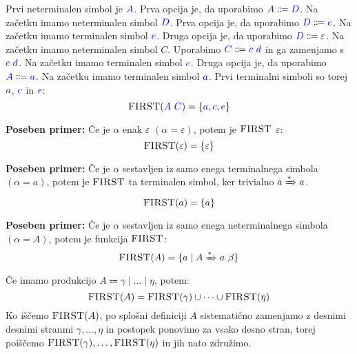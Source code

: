 \documentclass{article}
\newcommand{\Special}[1]{\textbf{#1}}
\newcommand{\FIRST}{\textsc{FIRST}}
\newcommand{\Symbol}[1]{\textcolor{blue}{#1}}
\newcommand{\Null}{\varepsilon}
\newcommand{\Arrow}{\Coloneqq}
\newcommand{\DeriveStar}{\xRightarrow{\ast}}
\newcommand{\Seq}{\ }
\newcommand{\Union}{\mathrel{|}}
\begin{document}
Prvi neterminalen simbol je $\Symbol{A}$.
Prva opcija je, da uporabimo $\Symbol{A} \Arrow \Symbol{D}$.
Na začetku imamo neterminalen simbol $\Symbol{D}$.
Prva opcija je, da uporabimo $\Symbol{D} \Arrow \Symbol{e}$.
Na začetku imamo terminalen simbol $\Symbol{e}$.
Druga opcija je, da uporabimo $\Symbol{D} \Arrow \Null$.
Na začetku imamo neterminalen simbol $C$.
Uporabimo $\Symbol{C} \Arrow \Symbol{c} \Seq \Symbol{d}$ in ga zamenjamo s $\Symbol{c} \Seq \Symbol{d}$.
Na začetku imamo terminalen simbol $\Symbol{c}$.
Druga opcija je, da uporabimo $\Symbol{A} \Arrow \Symbol{a}$.
Na začetku imamo terminalen simbol $\Symbol{a}$.
Prvi terminalni simboli so torej $\Symbol{a}$, $\Symbol{c}$ in $\Symbol{e}$:
\begin{equation*}
  \FIRST(\Symbol{A} \Seq \Symbol{C}) = \{\Symbol{a}, \Symbol{c}, \Symbol{e}\}
\end{equation*}

\Special{Poseben primer:} Če je $\alpha$ enak $\Null$ ${(\alpha = \Null)}$, potem je $\FIRST$ $\Null$:
\begin{equation*}
  \FIRST(\Null) = \{ \Null \}
\end{equation*}

\Special{Poseben primer:} Če je $\alpha$ sestavljen iz samo enega terminalnega simbola ${(\alpha = a)}$, potem je $\FIRST$ ta terminalen simbol, ker trivialno $a \DeriveStar a$.
\begin{equation*}
  \FIRST(a) = \{ a \}
\end{equation*}

\Special{Poseben primer:} Če je $\alpha$ sestavljen iz samo enega neterminalnega simbola ${(\alpha = A)}$, potem je funkcija $\FIRST$:
\begin{equation*}
  \FIRST(A) = \{ a \mid A \DeriveStar a \Seq \beta \}
\end{equation*}
Če imamo produkcijo $A \Arrow \gamma \Union \dots \Union \eta$, potem:
\begin{equation*}
  \FIRST(A) = \FIRST(\gamma) \cup \dots \cup \FIRST(\eta)
\end{equation*}
Ko iščemo $\FIRST(A)$, po splošni definiciji $A$ sistematično zamenjamo z desnimi desnimi stranmi $\gamma, \dots, \eta$ in postopek ponovimo za vsako desno stran, torej poiščemo $\FIRST(\gamma), \dots, \FIRST(\eta)$ in jih nato združimo.
\end{document}
